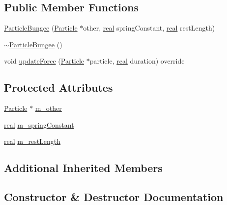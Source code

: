 \subsection*{Public Member Functions}
\begin{DoxyCompactItemize}
\item 
\mbox{\hyperlink{classrum_1_1_particle_bungee_a8908b5c848fb6ebc45f420e0924e033e}{Particle\+Bungee}} (\mbox{\hyperlink{classrum_1_1_particle}{Particle}} $\ast$other, \mbox{\hyperlink{namespacerum_a7e8cca23573d5eaead0f138cbaa4862c}{real}} spring\+Constant, \mbox{\hyperlink{namespacerum_a7e8cca23573d5eaead0f138cbaa4862c}{real}} rest\+Length)
\item 
\mbox{\hyperlink{classrum_1_1_particle_bungee_aaff4a95227aaec80896d0030ded6c6b3}{$\sim$\+Particle\+Bungee}} ()
\item 
void \mbox{\hyperlink{classrum_1_1_particle_bungee_ab383e386d231be2cb751d14515573c0e}{update\+Force}} (\mbox{\hyperlink{classrum_1_1_particle}{Particle}} $\ast$particle, \mbox{\hyperlink{namespacerum_a7e8cca23573d5eaead0f138cbaa4862c}{real}} duration) override
\end{DoxyCompactItemize}
\subsection*{Protected Attributes}
\begin{DoxyCompactItemize}
\item 
\mbox{\hyperlink{classrum_1_1_particle}{Particle}} $\ast$ \mbox{\hyperlink{classrum_1_1_particle_bungee_a86d11a089a58dca74854d94630d9f125}{m\+\_\+other}}
\item 
\mbox{\hyperlink{namespacerum_a7e8cca23573d5eaead0f138cbaa4862c}{real}} \mbox{\hyperlink{classrum_1_1_particle_bungee_a4a77b3fb166e4e56dc3a57f5807d985f}{m\+\_\+spring\+Constant}}
\item 
\mbox{\hyperlink{namespacerum_a7e8cca23573d5eaead0f138cbaa4862c}{real}} \mbox{\hyperlink{classrum_1_1_particle_bungee_a4392eb2dc76c9371acfddcb852bb3737}{m\+\_\+rest\+Length}}
\end{DoxyCompactItemize}
\subsection*{Additional Inherited Members}


\subsection{Constructor \& Destructor Documentation}
\mbox{\label{classrum_1_1_particle_bungee_a8908b5c848fb6ebc45f420e0924e033e}} 
